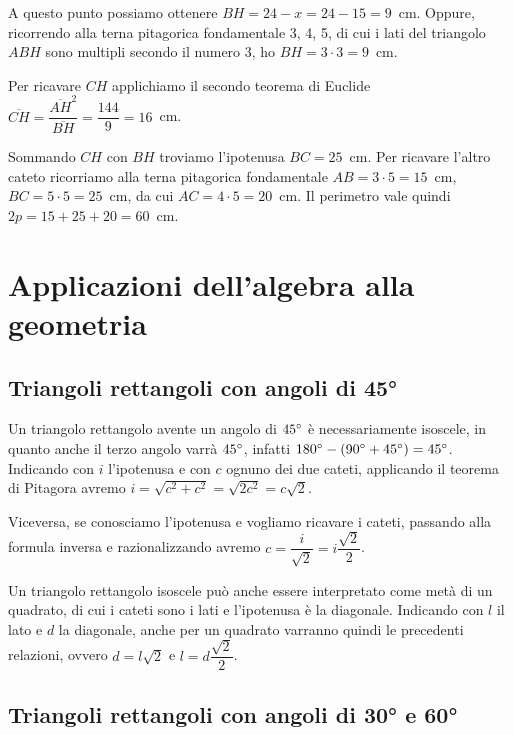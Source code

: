 \begin{exrig}
\begin{esempio}
A questo punto possiamo ottenere $BH = 24-x = 24-15 = 9$~cm. Oppure, ricorrendo alla terna pitagorica fondamentale 3, 4, 5, di cui i lati del triangolo $ABH$ sono multipli secondo il numero 3, ho $BH = 3 \cdot 3 = 9$~cm.

Per ricavare $CH$ applichiamo il secondo teorema di Euclide $\overline{CH}=\dfrac{\overline{AH}^2}{\overline{BH}}=\dfrac{144}{9}=16$~cm.

Sommando $CH$ con $BH$ troviamo l'ipotenusa $BC=25$~cm. Per ricavare l'altro cateto ricorriamo alla terna pitagorica fondamentale $AB=3\cdot 5=15$~cm, $BC=5\cdot 5=25$~cm, da cui $AC=4\cdot 5=20$~cm.
Il perimetro vale quindi $2p=15+25+20=60$~cm.
\end{esempio}
\end{exrig}

\section{Applicazioni dell'algebra alla geometria}

\subsection{Triangoli rettangoli con angoli di 45°}

\begin{wrapfigure}{r}{0.25\textwidth}
	\centering
\end{wrapfigure}
Un triangolo rettangolo avente un angolo di $45{}^{\circ}$ è necessariamente isoscele, in quanto anche il terzo angolo varrà $45{}^{\circ}$, infatti $180{}^{\circ} - (90{}^{\circ}+45{}^{\circ})=45{}^{\circ}$.
Indicando con $i$ l'ipotenusa e con $c$ ognuno dei due cateti, applicando il teorema di Pitagora avremo $i=\sqrt{c^2+c^2}=\sqrt{2c^2}=c\sqrt{2}$.

Viceversa, se conosciamo l'ipotenusa e vogliamo ricavare i cateti, passando alla formula inversa e razionalizzando avremo $c=\dfrac{i}{\sqrt{2}}=i\dfrac{\sqrt{2}}{2}$.

Un triangolo rettangolo isoscele può anche essere interpretato come metà di un quadrato, di cui i cateti sono i lati e l'ipotenusa è la diagonale.
Indicando con $l$ il lato e $d$ la diagonale, anche per un quadrato varranno quindi le precedenti relazioni, ovvero $d=l\sqrt{2}$ e $l=d\dfrac{\sqrt{2}}{2}$.

\subsection{Triangoli rettangoli con angoli di 30° e 60°}

